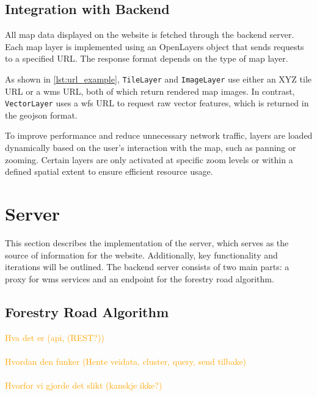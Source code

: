 \subsection{Integration with Backend}

All map data displayed on the website is fetched through the backend server. Each map layer is implemented using an OpenLayers object that sends requests to a specified URL. The response format depends on the type of map layer.

As shown in \autoref{lst:url_example}, \texttt{TileLayer} and \texttt{ImageLayer} use either an XYZ tile URL or a \gls{wms} URL, both of which return rendered map images. In contrast, \texttt{VectorLayer} uses a \gls{wfs} URL to request raw vector features, which is returned in the \gls{geojson} format.

\begin{figure}[h]

\end{figure}

To improve performance and reduce unnecessary network traffic, layers are loaded dynamically based on the user's interaction with the map, such as panning or zooming. Certain layers are only activated at specific zoom levels or within a defined spatial extent to ensure efficient resource usage.

\section{Server}\label{sec:implementation:server}

This section describes the implementation of the server, which serves as the source of information for the website. Additionally, key functionality and iterations will be outlined. The backend server consists of two main parts: a proxy for \Gls{wms} services and an endpoint for the forestry road algorithm. 

\subsection{Forestry Road Algorithm}\label{subsec:server:forestroadalgorithm}

\textcolor{orange}{
Hva det er (api, (REST?)) \\ \\
Hvordan den funker (Hente veidata, cluster, query, send tilbake) \\ \\
Hvorfor vi gjorde det slikt (kanskje ikke?)
}

